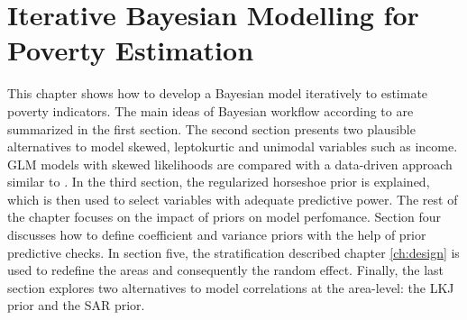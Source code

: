 \chapter{Iterative Bayesian Modelling for Poverty Estimation}

\label{ch:workflow}

This chapter shows how to develop a Bayesian model iteratively to estimate poverty indicators.
The main ideas of Bayesian workflow according to \cite{gelman_bayesian_2020} are summarized in the first section.
The second section presents two plausible alternatives to model skewed, leptokurtic and unimodal variables such as income. GLM models with skewed likelihoods are compared with a data-driven approach similar to \cite{morelli_hierarchical_2021}.
In the third section, the regularized horseshoe prior is explained, which is then used to select variables with adequate predictive power.
The rest of the chapter focuses on the impact of priors on model perfomance.
Section four discusses how to define coefficient and variance priors with the help of prior predictive checks.
In section five, the stratification described chapter \ref{ch:design} is used to redefine the areas and consequently the random effect.
Finally, the last section explores two alternatives to model correlations at the area-level: the LKJ prior and the SAR prior.








